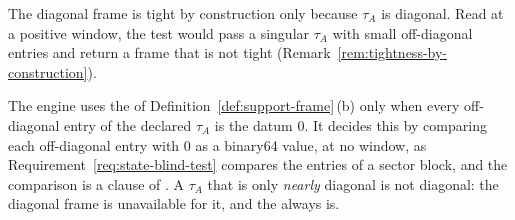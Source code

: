 
The diagonal frame is tight by construction only because $\tau_A$ is
diagonal. Read at a positive window, the test would pass a singular
$\tau_A$ with small off-diagonal entries and return a frame that is not
tight (Remark~\ref{rem:tightness-by-construction}).

\begin{requirement}\label{req:diagonal-frame-test}
The engine uses the  of
Definition~\ref{def:support-frame}\,(b) only when every off-diagonal entry
of the declared $\tau_A$ is the datum $0$. It decides this by comparing
each off-diagonal entry with $0$ as a binary64 value, at no window, as
Requirement~\ref{req:state-blind-test} compares the entries of a sector
block, and the comparison is a clause of . A
$\tau_A$ that is only \emph{nearly} diagonal is not diagonal: the diagonal
frame is unavailable for it, and the  always is.
\end{requirement}
